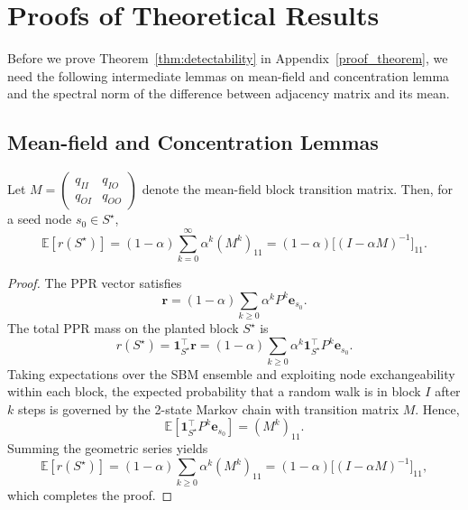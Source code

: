 \appendix
\section{Proofs of Theoretical Results}
\label{app:proofs}
Before we prove Theorem~\ref{thm:detectability} in Appendix~\ref{proof_theorem}, we need the following intermediate lemmas on mean-field and concentration lemma and the spectral norm of the difference between adjacency matrix and its mean.

\subsection{Mean-field and Concentration Lemmas}

\begin{lemma}
\label{lem:meanfield}

Let $M=\begin{pmatrix} q_{II} & q_{IO}\\ q_{OI} & q_{OO}\end{pmatrix}$ denote the mean-field block transition matrix.
Then, for a seed node $s_0\in S^\star$,
\[
\mathbb{E}[r(S^\star)] = (1-\alpha)\sum_{k=0}^\infty \alpha^k (M^k)_{11}
= (1-\alpha)\big[(I-\alpha M)^{-1}\big]_{11}.
\]
\end{lemma}

\begin{proof}
The PPR vector satisfies
\[
\mathbf{r} = (1-\alpha)\sum_{k\ge0}\alpha^k P^k \mathbf{e}_{s_0}.
\]
The total PPR mass on the planted block $S^\star$ is
\[
r(S^\star) = \mathbf{1}_{S^\star}^\top \mathbf{r}
= (1-\alpha)\sum_{k\ge0}\alpha^k 
\mathbf{1}_{S^\star}^\top P^k \mathbf{e}_{s_0}.
\]
Taking expectations over the SBM ensemble and exploiting node exchangeability within each block,
the expected probability that a random walk is in block $I$ after $k$ steps is governed by the 2-state Markov chain with transition matrix $M$. Hence,
\[
\mathbb{E}\!\left[\mathbf{1}_{S^\star}^\top P^k \mathbf{e}_{s_0}\right]
= (M^k)_{11}.
\]
Summing the geometric series yields
\[
\mathbb{E}[r(S^\star)] = (1-\alpha)\sum_{k\ge0}\alpha^k (M^k)_{11}
= (1-\alpha)\big[(I-\alpha M)^{-1}\big]_{11},
\]
which completes the proof.
\end{proof}



